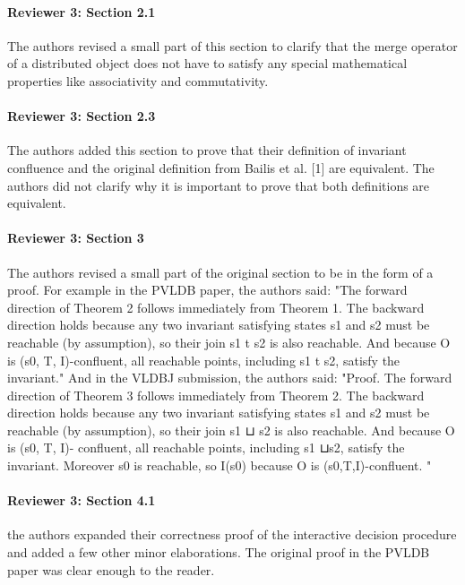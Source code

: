 \documentclass[9pt]{article}
\begin{document}
\begin{multicols*}{2}
\paragraph{Reviewer 3: Section 2.1}
\begin{feedback}
  The authors revised a small part of this section to clarify that the merge
  operator of a distributed object does not have to satisfy any special
  mathematical properties like associativity and commutativity.
\end{feedback}

\paragraph{Reviewer 3: Section 2.3}
\begin{feedback}
  The authors added this section to prove that their definition of invariant
  confluence and the original definition from Bailis et al.  [1] are
  equivalent. The authors did not clarify why it is important to prove that
  both definitions are equivalent.
\end{feedback}

\paragraph{Reviewer 3: Section 3}
\begin{feedback}
  The authors revised a small part of the original section to be in the form of
  a proof. For example in the PVLDB paper, the authors said: "The forward
  direction of Theorem 2 follows immediately from Theorem 1. The backward
  direction holds because any two invariant satisfying states s1 and s2 must be
  reachable (by assumption), so their join s1 t s2 is also reachable. And
  because O is (s0, T, I)-confluent, all reachable points, including s1 t s2,
  satisfy the invariant." And in the VLDBJ submission, the authors said:
  "Proof. The forward direction of Theorem 3 follows immediately from Theorem
  2. The backward direction holds because any two invariant satisfying states
  s1 and s2 must be reachable (by assumption), so their join s1 ⊔ s2 is also
  reachable. And because O is (s0, T, I)- confluent, all reachable points,
  including s1 ⊔s2, satisfy the invariant. Moreover s0 is reachable, so I(s0)
  because O is (s0,T,I)-confluent. "
\end{feedback}

\paragraph{Reviewer 3: Section 4.1}
\begin{feedback}
  the authors expanded their correctness proof of the interactive decision
  procedure and added a few other minor elaborations. The original proof in the
  PVLDB paper was clear enough to the reader.
\end{feedback}


\end{multicols*}
\end{document}
